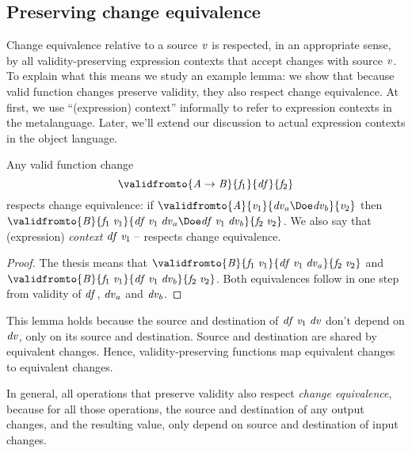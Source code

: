 \subsection{Preserving change equivalence}
Change equivalence relative to a source \ensuremath{\Varid{v}} is respected, in an appropriate
sense, by all validity-preserving expression contexts that accept changes with
source \ensuremath{\Varid{v}}.
To explain what this means we study an example lemma: we show that because valid
function changes preserve validity, they also respect change equivalence.
At first, we use ``(expression) context'' informally to refer to
expression contexts in the metalanguage. Later, we'll extend our
discussion to actual expression contexts in the object language.

\begin{lemma}
  \label{lem:ch-respect-doe}
Any valid function change
\[\ensuremath{\validfromto{\Conid{A}\to \Conid{B}}{\Varid{f}_{1}}{\Varid{df}}{\Varid{f}_{2}}}\]
respects change equivalence: if \ensuremath{\validfromto{\Conid{A}}{\Varid{v}_{1}}{\Varid{dv}_a\Doe\Varid{dv}_b}{\Varid{v}_{2}}} then
\ensuremath{\validfromto{\Conid{B}}{\Varid{f}_{1}\;\Varid{v}_{1}}{\Varid{df}\;\Varid{v}_{1}\;\Varid{dv}_a\Doe\Varid{df}\;\Varid{v}_{1}\;\Varid{dv}_b}{\Varid{f}_{2}\;\Varid{v}_{2}}}.
We also say that (expression) \emph{context} \ensuremath{\Varid{df}\;\Varid{v}_{1}\;\text{\textendash}}
respects change equivalence.
\end{lemma}
\begin{proof}
The thesis means that \ensuremath{\validfromto{\Conid{B}}{\Varid{f}_{1}\;\Varid{v}_{1}}{\Varid{df}\;\Varid{v}_{1}\;\Varid{dv}_a}{\Varid{f}_{2}\;\Varid{v}_{2}}} and \ensuremath{\validfromto{\Conid{B}}{\Varid{f}_{1}\;\Varid{v}_{1}}{\Varid{df}\;\Varid{v}_{1}\;\Varid{dv}_b}{\Varid{f}_{2}\;\Varid{v}_{2}}}. Both equivalences follow in one step from validity of
\ensuremath{\Varid{df}}, \ensuremath{\Varid{dv}_a} and \ensuremath{\Varid{dv}_b}.
\end{proof}

This lemma holds because the source and destination of \ensuremath{\Varid{df}\;\Varid{v}_{1}\;\Varid{dv}}
don't depend on \ensuremath{\Varid{dv}}, only on its source and destination. Source
and destination are shared by equivalent changes. Hence,
validity-preserving functions map equivalent changes to
equivalent changes.

In general, all operations that preserve validity also respect
\emph{change equivalence}, because for all those operations, the
source and destination of any output changes, and the resulting
value, only depend on source and destination of input changes.

